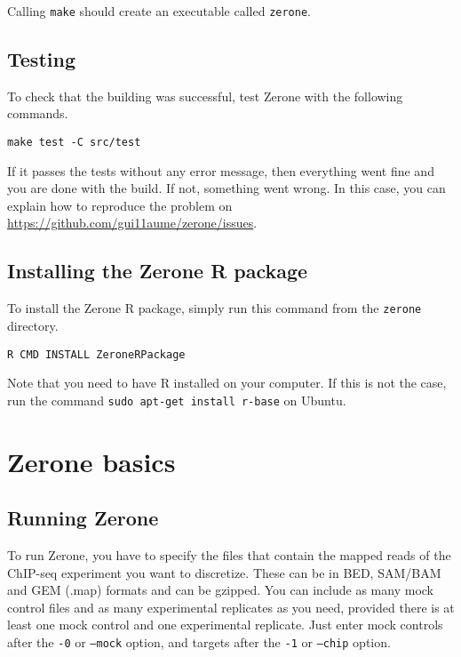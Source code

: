 \documentclass[12pt]{article}
\begin{document}
Calling \texttt{make} should create an executable called \texttt{zerone}.

\subsection{Testing}

To check that the building was successful, test Zerone with
the following commands.

\begin{verbatim}
make test -C src/test
\end{verbatim}

If it passes the tests without any error message, then everything went fine
and you are done with the build. If not, something went
wrong. In this case, you can explain how to reproduce the problem
on \url{https://github.com/gui11aume/zerone/issues}.

\subsection*{Installing the Zerone R package}

To install the Zerone R package, simply run this command from the
\texttt{zerone} directory.

\begin{verbatim}
R CMD INSTALL ZeroneRPackage
\end{verbatim}

Note that you need to have R installed on your computer. If this is not the
case, run the command \texttt{sudo apt-get install r-base} on Ubuntu.

\section{Zerone basics}

\subsection{Running Zerone}

To run Zerone, you have to specify the files that contain the mapped reads
of the ChIP-seq experiment you want to discretize. These can be in BED, SAM/BAM
and GEM (.map) formats and can be gzipped. You can include as many mock
control files and as many experimental replicates as you need, provided there
is at least one mock control and one experimental replicate. Just enter
mock controls after the \texttt{-0} or \texttt{--mock} option, and
targets after the \texttt{-1} or \texttt{--chip} option.
\end{document}
